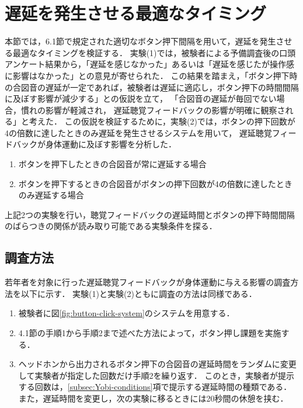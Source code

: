 \section{遅延を発生させる最適なタイミング}
本節では，6.1節で規定された適切なボタン押下間隔を用いて，遅延を発生させる最適なタイミングを検証する．
実験(1)では，被験者による予備調査後の口頭アンケート結果から，「遅延を感じなかった」あるいは「遅延を感じたが操作感に影響はなかった」との意見が寄せられた．
この結果を踏まえ，「ボタン押下時の合図音の遅延が一定であれば，被験者は遅延に適応し，ボタン押下の時間間隔に及ぼす影響が減少する」との仮説を立て，
「合図音の遅延が毎回でない場合，慣れの影響が軽減され，
遅延聴覚フィードバックの影響が明確に観察される」と考えた．
この仮説を検証するために，実験(2)では，ボタンの押下回数が4の倍数に達したときのみ遅延を発生させるシステムを用いて，
遅延聴覚フィードバックが身体運動に及ぼす影響を分析した．
\newpage
\begin{enumerate}[leftmargin=*, label=実験(\arabic*)]
    \item ボタンを押下したときの合図音が常に遅延する場合
    \item ボタンを押下するときの合図音がボタンの押下回数が4の倍数に達したときのみ遅延する場合
\end{enumerate}
上記2つの実験を行い，聴覚フィードバックの遅延時間とボタンの押下時間間隔のばらつきの関係が読み取り可能である実験条件を探る．
\subsection{調査方法}
若年者を対象に行った遅延聴覚フィードバックが身体運動に与える影響の調査方法を以下に示す．
実験(1)と実験(2)ともに調査の方法は同様である．
\begin{enumerate}[leftmargin=*]
  \item 被験者に図\ref{fig:button-click-system}のシステムを用意する．
  \item 4.1節の手順1から手順2まで述べた方法によって，ボタン押し課題を実施する．
  \item ヘッドホンから出力されるボタン押下の合図音の遅延時間をランダムに変更して実験者が指定した回数だけ手順2を繰り返す．
  このとき，実験者が提示する回数は，\ref{subsec:Yobi-conditions}項で提示する遅延時間の種類である．
  また，遅延時間を変更し，次の実験に移るときには20秒間の休憩を挟む．
\end{enumerate}

